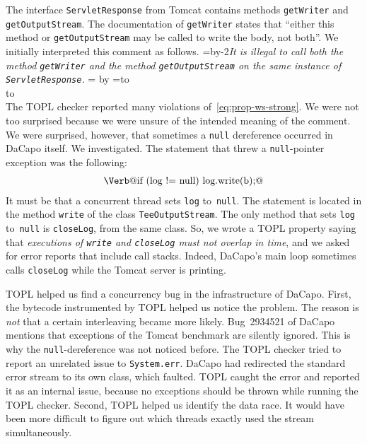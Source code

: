 \documentclass[9pt, preprint]{sigplanconf} %
\newcommand{\noterg}[2]{\textcolor{gray}{[\textcolor{red}{#1}: #2]}}
\newcommand{\rg}[1]{\noterg{rg}{#1}}
\newcommand{\quoteindent}{1.5\parindent} %
\newcommand{\eqquote}[2]{{%
  \refstepcounter{equation}\label{#2}%
  \newdimen\qi\qi=\quoteindent
  \setbox0=\vbox{\advance\hsize by-2\qi\noindent\em#1}%
  \newdimen\x\x=\ht0 \advance\x by\dp0%
  \setbox1=\vbox to\x{\vss\hbox{(\arabic{equation})}\vss}%
  \leavevmode\\[1ex]%
  \hbox to\hsize{\hskip\qi\box0\hfil\box1}%
  \\[1ex]}}
\theoremstyle{definition}
\theoremstyle{remark}
\begin{document}
The interface \texttt{ServletResponse} from Tomcat contains methods \texttt{getWriter} and \texttt{getOutputStream}.
The documentation of \texttt{getWriter} states that ``either this method or \texttt{getOutputStream} may be called to write the body, not both''.
We initially interpreted this comment as follows.
\eqquote{It is illegal to call both the method {\tt getWriter} and the method {\tt getOutputStream} on the same instance of {\tt ServletResponse}.}{eq:prop-ws-strong}
The TOPL checker reported many violations of~\eqref{eq:prop-ws-strong}.
We were not too surprised because we were unsure of the intended meaning of the comment.
We were surprised, however, that sometimes a {\tt null} dereference occurred in DaCapo itself.
We investigated.
The statement that threw a {\tt null}-pointer exception was the following:
\begin{align}\label{eq:npe-src}
\text{\Verb@if (log != null) log.write(b);@}
\end{align}
It must be that a concurrent thread sets {\tt log} to~{\tt null}.
The statement is located in the method {\tt write} of the class {\tt TeeOutputStream}.
The only method that sets {\tt log} to~{\tt null} is {\tt closeLog}, from the same class.
So, we wrote a TOPL property saying that \textit{executions of {\tt write} and {\tt closeLog} must not overlap in time}, and we asked for error reports that include call stacks.
Indeed, DaCapo's main loop sometimes calls {\tt closeLog} while the Tomcat server is printing.

TOPL helped us find a concurrency bug in the infrastructure of DaCapo.
First, the bytecode instrumented by TOPL helped us notice the problem.
The reason is \emph{not} that a certain interleaving became more likely.
Bug~2934521 of DaCapo mentions that exceptions of the Tomcat benchmark are silently ignored.
This is why the {\tt null}-dereference was not noticed before.
The TOPL checker tried to report an unrelated issue to {\tt System.err}.
DaCapo had redirected the standard error stream to its own class, which faulted.
TOPL caught the error and reported it as an internal issue, because no exceptions should be thrown while running the TOPL checker.
Second, TOPL helped us identify the data race.
It would have been more difficult to figure out which threads exactly used the stream simultaneously.
\end{document}
